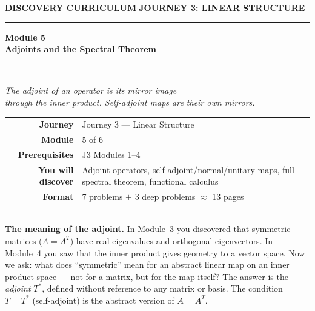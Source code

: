 \documentclass[12pt,a4paper]{article}
\newcounter{problem}
\begin{document}
\thispagestyle{empty}
\begin{center}
{\small\color{MidBlue}\textbf{DISCOVERY CURRICULUM}\quad$\cdot$\quad\textbf{JOURNEY 3: LINEAR STRUCTURE}}
\vspace{0.6cm}

{\color{NavyBlue}\rule{\linewidth}{2pt}}\vspace{0.5cm}

{\Huge\bfseries\color{NavyBlue}Module 5}\\[0.3cm]
{\LARGE\bfseries\color{MidBlue}Adjoints and the Spectral Theorem}\\[0.4cm]
{\color{Gold}\rule{0.4\linewidth}{1.2pt}}\\[0.4cm]
{\large\itshape\color{DarkGrey}
The adjoint of an operator is its mirror image\\[0.15cm]
through the inner product. Self-adjoint maps are their own mirrors.}

\vspace{1cm}
\begin{tabular}{rl}
\color{DarkGrey}\textbf{Journey}         & Journey 3 --- Linear Structure \\[4pt]
\color{DarkGrey}\textbf{Module}          & 5 of 6 \\[4pt]
\color{DarkGrey}\textbf{Prerequisites}   & J3 Modules 1--4 \\[4pt]
\color{DarkGrey}\textbf{You will discover} & Adjoint operators, self-adjoint/normal/unitary maps, full spectral theorem, functional calculus \\[4pt]
\color{DarkGrey}\textbf{Format}          & 7 problems $+$ 3 deep problems $\approx$ 13 pages \\
\end{tabular}
\vspace{1cm}

{\color{NavyBlue}\rule{\linewidth}{2pt}}
\end{center}

\vspace{0.5cm}
\noindent\textbf{The meaning of the adjoint.}
In Module~3 you discovered that symmetric matrices ($A = A^T$) have real eigenvalues and orthogonal eigenvectors. In Module~4 you saw that the inner product gives geometry to a vector space. Now we ask: what does ``symmetric'' mean for an abstract linear map on an inner product space --- not for a matrix, but for the map itself? The answer is the \emph{adjoint} $T^*$, defined without reference to any matrix or basis. The condition $T = T^*$ (self-adjoint) is the abstract version of $A = A^T$.
\end{document}
